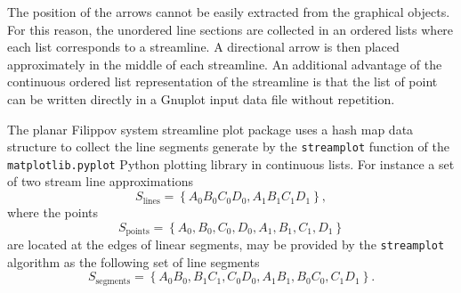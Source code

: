 \documentclass[english, a4paper]{article}
\begin{document}
The position of the arrows cannot be easily extracted from the graphical objects. For this reason, the unordered line sections are collected in an ordered lists where each list corresponds to a streamline. A directional arrow is then placed approximately in the middle of each streamline. An additional advantage of the continuous ordered list representation of the streamline is that the list of point can be written directly in a Gnuplot input data file without repetition.

The planar Filippov system streamline plot package uses a hash map data structure to collect the line segments generate by the \texttt{streamplot} function of the \texttt{matplotlib.pyplot} Python plotting library in continuous lists. For instance a set of two stream line approximations
\begin{equation}
	S_{\mathrm{lines}} = \left\{ A_{0}B_{0}C_{0}D_{0}, A_{1}B_{1}C_{1}D_{1} \right\},
\end{equation}
where the points
\begin{equation}
	S_{\mathrm{points}} = \left\{ A_{0}, B_{0}, C_{0}, D_{0}, A_{1}, B_{1}, C_{1}, D_{1} \right\}
\end{equation}
are located at the edges of linear segments, may be provided by the \texttt{streamplot} algorithm as the following set of line segments
\begin{equation}
	S_{\mathrm{segments}} = \left\{ A_{0}B_{0}, B_{1} C_{1}, C_{0}D_{0}, A_{1}B_{1}, B_{0}C_{0}, C_{1} D_{1} \right\}.
\end{equation}
\end{document}
